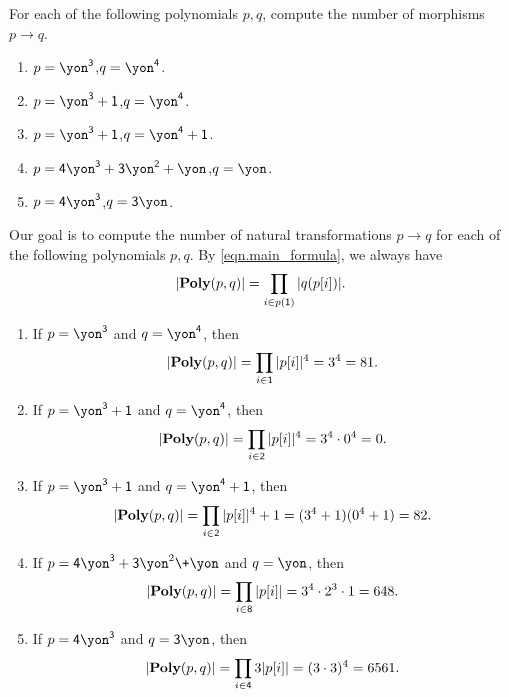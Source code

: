 \documentclass[Book-Poly]{subfiles}
\begin{document}
\begin{exercise}
For each of the following polynomials $p,q$, compute the number of morphisms $p\to q$.
\begin{enumerate}
	\item $p=\yon^\3$,\quad $q=\yon^\4$.
	\item $p=\yon^\3+\1$,\quad $q=\yon^\4$.
	\item $p=\yon^\3+\1$,\quad $q=\yon^\4+\1$.
	\item $p=\4\yon^\3+\3\yon^\2+\yon$,\quad $q=\yon$.
	\item $p=\4\yon^\3$,\quad $q=\3\yon$.
\qedhere
\end{enumerate}
\begin{solution}
Our goal is to compute the number of natural transformations $p\to q$ for each of the following polynomials $p,q$.
By \eqref{eqn.main_formula}, we always have
\[
    |\textbf{Poly}(p, q)| = \prod_{i \in p(\textsf{1})} |q(p[i])|.
\]
\begin{enumerate}
	\item If $p=\yon^\3$ and $q=\yon^\4$, then
	\[
	    |\textbf{Poly}(p, q)| = \prod_{i \in \textsf{1}} |p[i]|^4 = 3^4 = 81.
	\]
	\item If $p=\yon^\3+\1$ and $q=\yon^\4$, then
	\[
	    |\textbf{Poly}(p, q)| = \prod_{i \in \textsf{2}} |p[i]|^4 = 3^4 \cdot 0^4 = 0.
	\]
	\item If $p=\yon^\3+\1$ and $q=\yon^\4+\1$, then
	\[
	    |\textbf{Poly}(p, q)| = \prod_{i \in \textsf{2}} |p[i]|^4 + 1 = (3^4 + 1)(0^4 + 1) = 82.
	\]
	\item If $p=\4\yon^\3+\3\yon^2\+\yon$ and $q=\yon$, then
	\[
	    |\textbf{Poly}(p, q)| = \prod_{i \in \textsf{8}} |p[i]| = 3^4 \cdot 2^3 \cdot 1 = 648.
	\]
	\item If $p=\4\yon^\3$ and $q=\3\yon$, then
	\[
	    |\textbf{Poly}(p, q)| = \prod_{i \in \textsf{4}} 3|p[i]| = (3 \cdot 3)^4 = 6561.
	\]
\qedhere
\end{enumerate}
\end{solution}
\end{exercise}
\end{document}
